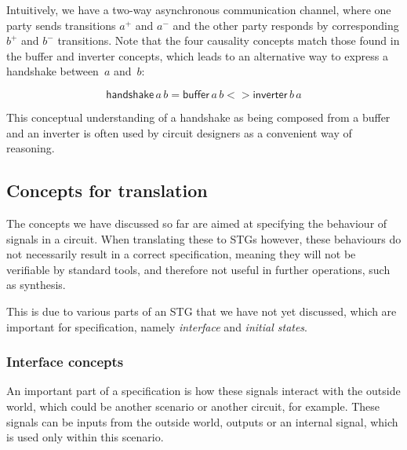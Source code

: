 \documentclass[british,conference,compsoc]{IEEEtran}
\begin{document}
Intuitively, we have a two-way asynchronous communication channel,
where one party sends transitions $a^{+}$ and $a^{-}$ and the other
party responds by corresponding $b^{+}$ and $b^{-}$ transitions.
Note that the four causality concepts match those found
in the buffer and inverter concepts, which leads to an alternative
way to express a handshake between~$a$ and~$b$:

\vspace{-3mm}

\[
\mathsf{handshake}\,a\, b=\mathsf{buffer}\,a\, b <>\mathsf{inverter}\,b\, a
\]

\vspace{-1mm}

This conceptual understanding of a handshake as being composed
from a buffer and an inverter is often used by circuit designers as
a convenient way of reasoning.

\vspace{-2mm}

\subsection{Concepts for translation\label{sub:trans-concepts}}

\vspace{-2mm}

The concepts we have discussed so far are aimed at specifying the behaviour of 
signals in a circuit. When translating these to STGs however, these behaviours 
do not necessarily result in a correct specification, meaning they will not be 
verifiable by standard tools, and therefore not useful in further operations, 
such as synthesis.

This is due to various parts of an STG that we have not yet discussed, which 
are important for specification, namely \emph{interface} and 
\emph{initial states}.

\vspace{-3mm}

\subsubsection{Interface concepts\label{sub:interface}} 

An important part of a specification is how these signals interact with the 
outside world, which could be another scenario or another circuit, for example.
These signals can be inputs from the outside world, outputs or an internal 
signal, which is used only within this scenario. 
\end{document}
